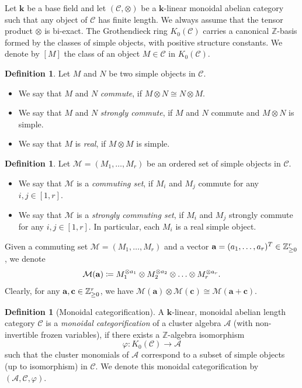 \documentclass[12pt]{amsart}
\theoremstyle{definition}
\newtheorem{definition}[theorem]{Definition}
\theoremstyle{remark}
\numberwithin{equation}{section}
\begin{document}
Let $\mathbf{k}$ be a base field and let $(\mathcal C,\otimes)$ be a $\mathbf{k}$-linear monoidal abelian category  such that any object of $\mathcal C$ has finite length. 
We always assume that the tensor product $\otimes$ is bi-exact. 
The Grothendieck ring $K_0(\mathcal{C})$ carries a canonical $\mathbb{Z}$-basis formed by the classes of simple objects, with positive structure constants.
We denote by $[M]$ the class of an object $M\in\mathcal C$ in $K_0(\mathcal{C})$.


\begin{definition} Let $M$ and $N$ be two simple objects in $\mathcal C$.
\begin{itemize}
    \item[(i)] We say that $M$ and $N$ {\em commute}, if $M\otimes N\cong N\otimes M$.  
    \item[(ii)] We say that $M$ and $N$ {\em strongly commute}, if $M$ and $N$ commute and  $M\otimes N$ is simple. 
    \item[(iii)] We say that $M$ is {\em real}, if $M\otimes M$ is simple. 
\end{itemize}
\end{definition}

\begin{definition} Let $\mathcal M=(M_1,\ldots,M_r)$ be an ordered set of simple objects in $\mathcal C$.
\begin{itemize}
    \item [(i)] We say that $\mathcal M$ is a  {\em commuting set}, if $M_i$ and $M_j$ commute for any $i,j\in[1,r]$.
    \item[(ii)] We say that $\mathcal M$ is a {\em strongly commuting set}, if $M_i$ and $M_j$ strongly commute for any $i,j\in[1,r]$. In particular, each $M_i$ is a real simple object.
    \end{itemize}
\end{definition}

Given a commuting  set $\mathcal M=(M_1,\ldots,M_r)$ and a vector ${\bf a}=(a_1,\ldots,a_r)^T\in\mathbb Z_{\geq 0}^r$, 
we denote 
$$\mathcal M({\bf a}) \coloneqq M_1^{\otimes a_1}\otimes M_2^{\otimes a_2}\otimes \ldots \otimes M_r^{\otimes a_r}.$$
Clearly, for any ${\bf a}, {\bf c}\in\mathbb Z_{\geq 0}^r$, we have
 $\mathcal{M}(\mathbf{a}) \otimes \mathcal{M}(\mathbf{c}) \cong \mathcal{M}(\mathbf{a }+ \mathbf{c})$.

\begin{definition}[Monoidal categorification]
  A  $\mathbf{k}$-linear, monoidal abelian length category $\mathcal C$ is a {\em monoidal categorification} of a cluster algebra $\mathcal A$ (with non-invertible frozen variables), if there exists a $\mathbb Z$-algebra isomorphism $$\varphi\colon{K}_0(\mathcal C)\rightarrow \mathcal A$$ such that the cluster monomials of $\mathcal A$ correspond to a subset of simple objects (up to isomorphism) in $\mathcal C$. We denote this monoidal categorification by $(\mathcal A, \mathcal C, \varphi)$.
\end{definition}
\end{document}
